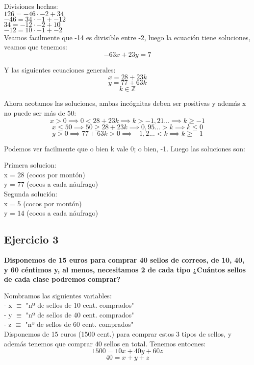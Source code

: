 \documentclass[11pt, a4paper, titlepage]{article}
\providecommand{\ent}{\mathbb{Z}}
\begin{document}
Divisiones hechas: \\
$ 126 = -46 \cdot -2 + 34 $ \\
$ -46 = 34 \cdot -1 + -12 $ \\
$ 34 = -12 \cdot -2 + 10 $ \\
$ -12 = 10 \cdot -1 + -2 $ \\

Veamos facilmente que -14 es divisible entre -2, luego la ecuación tiene soluciones, veamos que tenemos:
$$ -63x + 23y = 7 $$

Y las siguientes ecuaciones generales:
$$ x = 28 + 23k $$
$$ y = 77 + 63k $$
$$ k \in \ent $$

Ahora acotamos las soluciones, ambas incógnitas deben ser positivas y además x no puede ser más de 50:
$$ x > 0 \implies 0 < 28 + 23k \implies k > -1,21... \implies k \geq -1 $$
$$ x \leq 50 \implies 50 \geq 28 + 23k \implies 0,95... > k \implies k \leq 0 $$
$$ y > 0 \implies 77 + 63k > 0 \implies -1,2... < k \implies k \geq -1 $$

Podemos ver facilmente que o bien k vale 0; o bien, -1. Luego las soluciones son:

Primera solucion: \\
x = 28 (cocos por montón) \\
y = 77 (cocos a cada náufrago) \\

Segunda solución: \\
x = 5 (cocos por montón) \\
y = 14 (cocos a cada náufrago) \\

\subsection{\LARGE{Ejercicio 3}}

\textbf{Disponemos de 15 euros para comprar 40 sellos de correos, de 10, 40, y
60 céntimos y, al menos, necesitamos 2 de cada tipo ¿Cuántos sellos de cada clase
podremos comprar?}

Nombramos las siguientes variables: \\
- x $\equiv$ "nº de sellos de 10 cent. comprados" \\
- y $\equiv$ "nº de sellos de 40 cent. comprados" \\
- z $\equiv$ "nº de sellos de 60 cent. comprados" \\

Disponemos de 15 euros (1500 cent.) para comprar estos 3 tipos de sellos, y además tenemos que comprar 40 sellos en total. Tenemos entocnes:
$$ 1500 = 10x + 40y + 60z $$
$$ 40 = x + y + z $$
\end{document}
